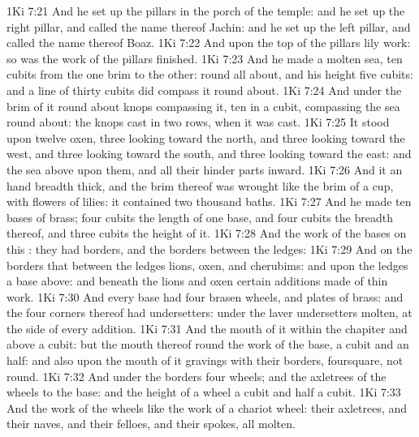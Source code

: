 \vs 1Ki 7:21 And he set up the pillars in the porch of the temple: and he set up the right pillar, and called the name thereof Jachin: and he set up the left pillar, and called the name thereof Boaz.
\vs 1Ki 7:22 And upon the top of the pillars  lily work: so was the work of the pillars finished.
\vs 1Ki 7:23 And he made a molten sea, ten cubits from the one brim to the other:  round all about, and his height  five cubits: and a line of thirty cubits did compass it round about.
\vs 1Ki 7:24 And under the brim of it round about  knops compassing it, ten in a cubit, compassing the sea round about: the knops  cast in two rows, when it was cast.
\vs 1Ki 7:25 It stood upon twelve oxen, three looking toward the north, and three looking toward the west, and three looking toward the south, and three looking toward the east: and the sea  above upon them, and all their hinder parts  inward.
\vs 1Ki 7:26 And it  an hand breadth thick, and the brim thereof was wrought like the brim of a cup, with flowers of lilies: it contained two thousand baths.
\vs 1Ki 7:27 And he made ten bases of brass; four cubits  the length of one base, and four cubits the breadth thereof, and three cubits the height of it.
\vs 1Ki 7:28 And the work of the bases  on this : they had borders, and the borders  between the ledges:
\vs 1Ki 7:29 And on the borders that  between the ledges  lions, oxen, and cherubims: and upon the ledges  a base above: and beneath the lions and oxen  certain additions made of thin work.
\vs 1Ki 7:30 And every base had four brasen wheels, and plates of brass: and the four corners thereof had undersetters: under the laver  undersetters molten, at the side of every addition.
\vs 1Ki 7:31 And the mouth of it within the chapiter and above  a cubit: but the mouth thereof  round  the work of the base, a cubit and an half: and also upon the mouth of it  gravings with their borders, foursquare, not round.
\vs 1Ki 7:32 And under the borders  four wheels; and the axletrees of the wheels  to the base: and the height of a wheel  a cubit and half a cubit.
\vs 1Ki 7:33 And the work of the wheels  like the work of a chariot wheel: their axletrees, and their naves, and their felloes, and their spokes,  all molten.
